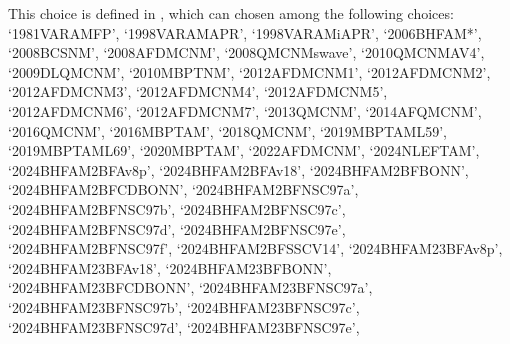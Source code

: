 \documentclass[letterpaper,10pt,english]{sphinxmanual}
\begin{document}
\begin{fulllineitems}
\sphinxAtStartPar
This choice is defined in , which can chosen among     the following choices:     ‘1981\sphinxhyphen{}VAR\sphinxhyphen{}AM\sphinxhyphen{}FP’, ‘1998\sphinxhyphen{}VAR\sphinxhyphen{}AM\sphinxhyphen{}APR’, ‘1998\sphinxhyphen{}VAR\sphinxhyphen{}AM\sphinxhyphen{}iAPR’, ‘2006\sphinxhyphen{}BHF\sphinxhyphen{}AM*’, ‘2008\sphinxhyphen{}BCS\sphinxhyphen{}NM’, ‘2008\sphinxhyphen{}AFDMC\sphinxhyphen{}NM’,     ‘2008\sphinxhyphen{}QMC\sphinxhyphen{}NM\sphinxhyphen{}swave’, ‘2010\sphinxhyphen{}QMC\sphinxhyphen{}NM\sphinxhyphen{}AV4’, ‘2009\sphinxhyphen{}DLQMC\sphinxhyphen{}NM’, ‘2010\sphinxhyphen{}MBPT\sphinxhyphen{}NM’,     ‘2012\sphinxhyphen{}AFDMC\sphinxhyphen{}NM\sphinxhyphen{}1’, ‘2012\sphinxhyphen{}AFDMC\sphinxhyphen{}NM\sphinxhyphen{}2’, ‘2012\sphinxhyphen{}AFDMC\sphinxhyphen{}NM\sphinxhyphen{}3’, ‘2012\sphinxhyphen{}AFDMC\sphinxhyphen{}NM\sphinxhyphen{}4’,     ‘2012\sphinxhyphen{}AFDMC\sphinxhyphen{}NM\sphinxhyphen{}5’, ‘2012\sphinxhyphen{}AFDMC\sphinxhyphen{}NM\sphinxhyphen{}6’, ‘2012\sphinxhyphen{}AFDMC\sphinxhyphen{}NM\sphinxhyphen{}7’,     ‘2013\sphinxhyphen{}QMC\sphinxhyphen{}NM’, ‘2014\sphinxhyphen{}AFQMC\sphinxhyphen{}NM’, ‘2016\sphinxhyphen{}QMC\sphinxhyphen{}NM’, ‘2016\sphinxhyphen{}MBPT\sphinxhyphen{}AM’,     ‘2018\sphinxhyphen{}QMC\sphinxhyphen{}NM’, ‘2019\sphinxhyphen{}MBPT\sphinxhyphen{}AM\sphinxhyphen{}L59’, ‘2019\sphinxhyphen{}MBPT\sphinxhyphen{}AM\sphinxhyphen{}L69’,     ‘2020\sphinxhyphen{}MBPT\sphinxhyphen{}AM’, ‘2022\sphinxhyphen{}AFDMC\sphinxhyphen{}NM’, ‘2024\sphinxhyphen{}NLEFT\sphinxhyphen{}AM’,     ‘2024\sphinxhyphen{}BHF\sphinxhyphen{}AM\sphinxhyphen{}2BF\sphinxhyphen{}Av8p’, ‘2024\sphinxhyphen{}BHF\sphinxhyphen{}AM\sphinxhyphen{}2BF\sphinxhyphen{}Av18’, ‘2024\sphinxhyphen{}BHF\sphinxhyphen{}AM\sphinxhyphen{}2BF\sphinxhyphen{}BONN’, ‘2024\sphinxhyphen{}BHF\sphinxhyphen{}AM\sphinxhyphen{}2BF\sphinxhyphen{}CDBONN’,     ‘2024\sphinxhyphen{}BHF\sphinxhyphen{}AM\sphinxhyphen{}2BF\sphinxhyphen{}NSC97a’, ‘2024\sphinxhyphen{}BHF\sphinxhyphen{}AM\sphinxhyphen{}2BF\sphinxhyphen{}NSC97b’, ‘2024\sphinxhyphen{}BHF\sphinxhyphen{}AM\sphinxhyphen{}2BF\sphinxhyphen{}NSC97c’, ‘2024\sphinxhyphen{}BHF\sphinxhyphen{}AM\sphinxhyphen{}2BF\sphinxhyphen{}NSC97d’,     ‘2024\sphinxhyphen{}BHF\sphinxhyphen{}AM\sphinxhyphen{}2BF\sphinxhyphen{}NSC97e’, ‘2024\sphinxhyphen{}BHF\sphinxhyphen{}AM\sphinxhyphen{}2BF\sphinxhyphen{}NSC97f’, ‘2024\sphinxhyphen{}BHF\sphinxhyphen{}AM\sphinxhyphen{}2BF\sphinxhyphen{}SSCV14’,     ‘2024\sphinxhyphen{}BHF\sphinxhyphen{}AM\sphinxhyphen{}23BF\sphinxhyphen{}Av8p’, ‘2024\sphinxhyphen{}BHF\sphinxhyphen{}AM\sphinxhyphen{}23BF\sphinxhyphen{}Av18’, ‘2024\sphinxhyphen{}BHF\sphinxhyphen{}AM\sphinxhyphen{}23BF\sphinxhyphen{}BONN’, ‘2024\sphinxhyphen{}BHF\sphinxhyphen{}AM\sphinxhyphen{}23BF\sphinxhyphen{}CDBONN’,     ‘2024\sphinxhyphen{}BHF\sphinxhyphen{}AM\sphinxhyphen{}23BF\sphinxhyphen{}NSC97a’, ‘2024\sphinxhyphen{}BHF\sphinxhyphen{}AM\sphinxhyphen{}23BF\sphinxhyphen{}NSC97b’, ‘2024\sphinxhyphen{}BHF\sphinxhyphen{}AM\sphinxhyphen{}23BF\sphinxhyphen{}NSC97c’, ‘2024\sphinxhyphen{}BHF\sphinxhyphen{}AM\sphinxhyphen{}23BF\sphinxhyphen{}NSC97d’,     ‘2024\sphinxhyphen{}BHF\sphinxhyphen{}AM\sphinxhyphen{}23BF\sphinxhyphen{}NSC97e’, 
\end{fulllineitems}
\end{document}
